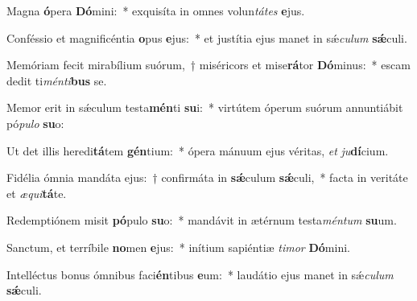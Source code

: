 \item Magna \textbf{ó}pera \textbf{Dó}mini:~* exquisíta in omnes volun\textit{tá}\textit{tes} \textbf{e}jus.
\item Conféssio et magnificéntia \textbf{o}pus \textbf{e}jus:~* et justítia ejus manet in sǽ\textit{cu}\textit{lum} \textbf{sǽ}culi.
\item Memóriam fecit mirabílium suórum,~† miséricors et mise\textbf{rá}tor \textbf{Dó}minus:~* escam dedit ti\textit{mén}\textit{ti}\textbf{bus} se.
\item Memor erit in sǽculum testa\textbf{mén}ti \textbf{su}i:~* virtútem óperum suórum annuntiábit pó\textit{pu}\textit{lo} \textbf{su}o:
\item Ut det illis heredi\textbf{tá}tem \textbf{gén}tium:~* ópera mánuum ejus véritas, \textit{et} \textit{ju}\textbf{dí}cium.
\item Fidélia ómnia mandáta ejus:~† confirmáta in \textbf{sǽ}culum \textbf{sǽ}culi,~* facta in veritáte et \textit{æ}\textit{qui}\textbf{tá}te.
\item Redemptiónem misit \textbf{pó}pulo \textbf{su}o:~* mandávit in ætérnum testa\textit{mén}\textit{tum} \textbf{su}um.
\item Sanctum, et terríbile \textbf{no}men \textbf{e}jus:~* inítium sapiéntiæ \textit{ti}\textit{mor} \textbf{Dó}mini.
\item Intelléctus bonus ómnibus faci\textbf{én}tibus \textbf{e}um:~* laudátio ejus manet in sǽ\textit{cu}\textit{lum} \textbf{sǽ}culi.

